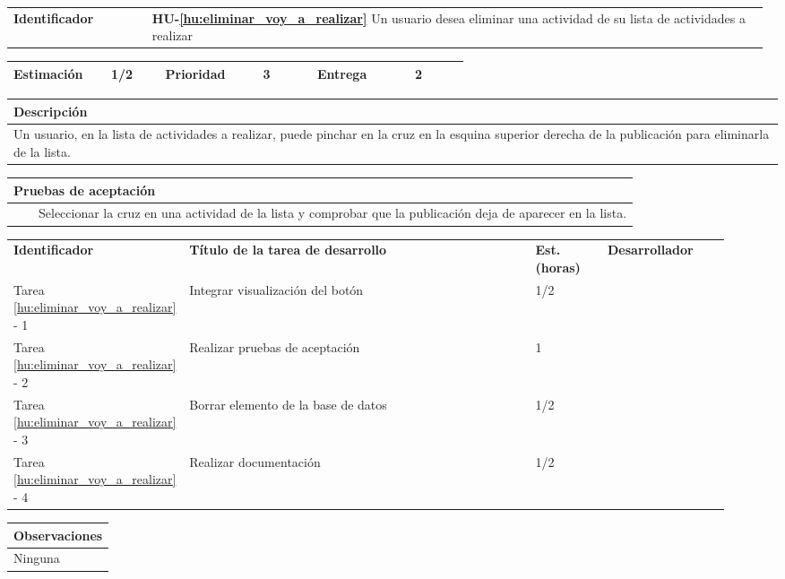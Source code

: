 \documentclass[11pt]{article}
\newcommand{\tabitem}{~~\llap{\textbullet}~~}
\begin{document}
\begin{longtable}{p{0.18\linewidth}|p{0.8\linewidth}}
  \rowcolor{LightCyan}
  \textbf{Identificador} & \textbf{HU-\ref{hu:eliminar_voy_a_realizar}} Un usuario desea eliminar una actividad de su lista de actividades a realizar \\  
\end{longtable}
\vspace{-0.8cm}
\begin{longtable}{p{0.18\linewidth}|p{0.1\linewidth}|p{0.18\linewidth}|p{0.1\linewidth}|p{0.18\linewidth}|p{0.1\linewidth}}
  \toprule
  \textbf{Estimación} & 1/2 & \textbf{Prioridad} & 3 & \textbf{Entrega} & 2 \\
  \bottomrule
\end{longtable}
\vspace{-0.8cm}
\begin{longtable}{p{1.028\linewidth}}
  \textbf{Descripción}\\
  \midrule Un usuario, en la lista de actividades a realizar, puede pinchar en la cruz en la esquina superior derecha de la publicación para eliminarla de la lista.\\
  \bottomrule
\end{longtable}
\vspace{-0.8cm}
\begin{longtable}{p{1.028\linewidth}}
  \textbf{Pruebas de aceptación}\\
  \midrule
  \tabitem Seleccionar la cruz en una actividad de la lista y comprobar que la publicación deja de aparecer en la lista.\\
\end{longtable}
\vspace{-0.8cm}
\begin{longtable}{p{0.18\linewidth}|p{0.48\linewidth}|p{0.1\linewidth}|p{0.17\linewidth}}
  \toprule
  \textbf{Identificador} & \textbf{Título de la tarea de desarrollo} & \textbf{Est. (horas)} & \textbf{Desarrollador} \\
  Tarea \ref{hu:eliminar_voy_a_realizar} - 1 & Integrar visualización del botón & 1/2 &\\
  Tarea \ref{hu:eliminar_voy_a_realizar} - 2 & Realizar pruebas de aceptación& 1 & \\
  Tarea \ref{hu:eliminar_voy_a_realizar} - 3 & Borrar elemento de la base de datos & 1/2 & \\
  Tarea \ref{hu:eliminar_voy_a_realizar} - 4 & Realizar documentación & 1/2 &  \\
  \bottomrule
\end{longtable}
\vspace{-0.8cm}
\begin{longtable}{p{1.028\linewidth}}
  \textbf{Observaciones}\\
  \midrule
  Ninguna\\
  \bottomrule
\end{longtable}
\end{document}
